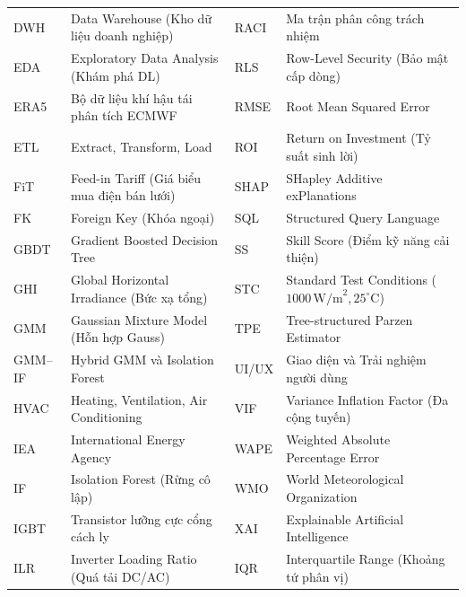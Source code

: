 \documentclass[12pt, a4paper]{report}
\begin{document}
\begin{table}[H]
\begin{tabularx}{\textwidth}{@{} l >{\raggedright\arraybackslash}X @{\hspace{10pt}} l >{\raggedright\arraybackslash}X @{}}
DWH       & Data Warehouse (Kho dữ liệu doanh nghiệp)  & RACI      & Ma trận phân công trách nhiệm \\
EDA       & Exploratory Data Analysis (Khám phá DL)    & RLS       & Row-Level Security (Bảo mật cấp dòng) \\
ERA5      & Bộ dữ liệu khí hậu tái phân tích ECMWF     & RMSE      & Root Mean Squared Error \\
ETL       & Extract, Transform, Load                   & ROI       & Return on Investment (Tỷ suất sinh lời) \\
FiT       & Feed-in Tariff (Giá biểu mua điện bán lưới)& SHAP      & SHapley Additive exPlanations \\
FK        & Foreign Key (Khóa ngoại)                   & SQL       & Structured Query Language \\
GBDT      & Gradient Boosted Decision Tree             & SS        & Skill Score (Điểm kỹ năng cải thiện) \\
GHI       & Global Horizontal Irradiance (Bức xạ tổng) & STC       & Standard Test Conditions ($1000\,\text{W/m}^2, 25^\circ\text{C}$) \\
GMM       & Gaussian Mixture Model (Hỗn hợp Gauss)     & TPE       & Tree-structured Parzen Estimator \\
GMM--IF   & Hybrid GMM và Isolation Forest             & UI/UX     & Giao diện và Trải nghiệm người dùng \\
HVAC      & Heating, Ventilation, Air Conditioning     & VIF       & Variance Inflation Factor (Đa cộng tuyến) \\
IEA       & International Energy Agency                & WAPE      & Weighted Absolute Percentage Error \\
IF        & Isolation Forest (Rừng cô lập)             & WMO       & World Meteorological Organization \\
IGBT      & Transistor lưỡng cực cổng cách ly          & XAI       & Explainable Artificial Intelligence \\
ILR       & Inverter Loading Ratio (Quá tải DC/AC)     & IQR       & Interquartile Range (Khoảng tứ phân vị) \\
\bottomrule
\end{tabularx}
\end{table}

\newpage


\end{document}
